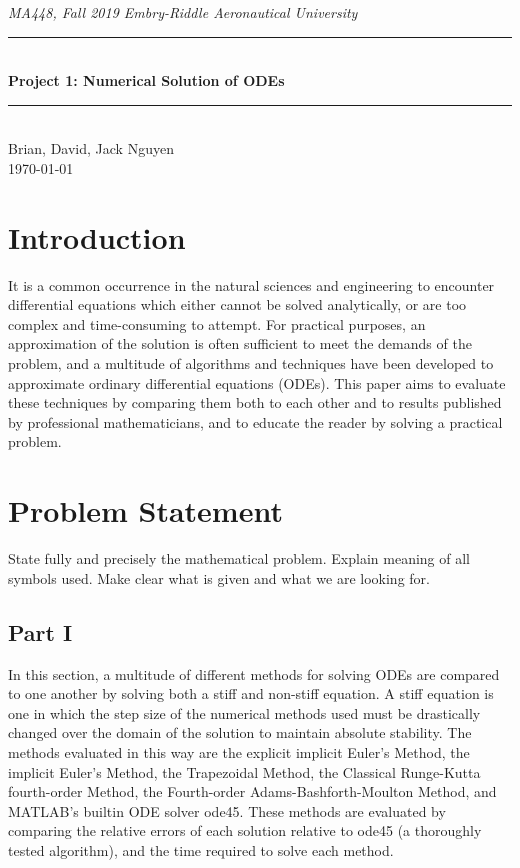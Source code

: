 \documentclass[11pt]{article}
\newcommand{\horrule}[1]{\rule{\linewidth}{#1}}      %
\begin{document}
\begin{center}
{\it MA448, Fall 2019  \hfill Embry-Riddle Aeronautical University
 }\\
\horrule{0.5pt} \\[0.4cm]
{\bf \Large  %
Project 1: Numerical Solution of ODEs
}\\
\horrule{2pt} \\[5cm]
Brian, David, Jack Nguyen %
\\[0.4cm]
\today %
\end{center}
\thispagestyle{empty}
\newpage
\begin{abstract}
\end{abstract}
\tableofcontents 
\newpage
\section{Introduction}\label{S:1}
It is a common occurrence in the natural sciences and engineering to encounter
differential equations which either cannot be solved analytically, or are too 
complex and time-consuming to attempt. For practical purposes, an approximation
of the solution is often sufficient to meet the demands of the problem, and a
multitude of algorithms and techniques have been developed to approximate 
ordinary differential equations (ODEs). This paper aims to evaluate these techniques by 
comparing them both to each other and to results published by professional mathematicians, 
and to educate the reader by solving a practical problem.
\section{Problem Statement}\label{S:2}
State fully and precisely the mathematical problem.  
Explain meaning of all symbols used. Make clear what is given and what we are 
looking for. 
\subsection{Part I}\label{S:2.1}
%
In this section, a multitude of different methods for solving ODEs are compared 
to one another by solving both a stiff and non-stiff equation. A stiff equation
is one in which the step size of the numerical methods used must be drastically
changed over the domain of the solution to maintain absolute stability. The 
methods evaluated in this way are the explicit implicit Euler's Method, the
implicit Euler's Method, the Trapezoidal Method, the Classical Runge-Kutta 
fourth-order Method, the Fourth-order Adams-Bashforth-Moulton Method, and MATLAB's
builtin ODE solver ode45. These methods are evaluated by comparing the relative
errors of each solution relative to ode45 (a thoroughly tested algorithm), and 
the time required to solve each method.
\end{document}
